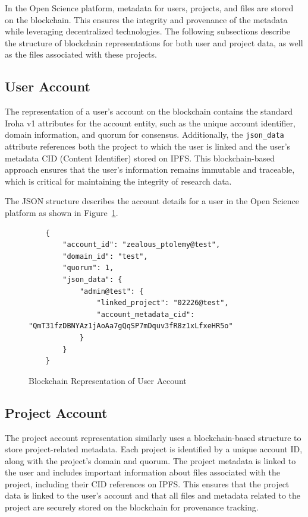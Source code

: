 \documentclass{article}
\begin{document}
In the Open Science platform, metadata for users, projects, and files are stored on the blockchain. This ensures the integrity and provenance of the metadata while leveraging decentralized technologies. The following subsections describe the structure of blockchain representations for both user and project data, as well as the files associated with these projects.

\subsection{User Account}

The representation of a user's account on the blockchain contains the standard Iroha v1 attributes for the account entity, such as the unique account identifier, domain information, and quorum for consensus. Additionally, the \texttt{json\_data} attribute references both the project to which the user is linked and the user's metadata CID (Content Identifier) stored on IPFS. This blockchain-based approach ensures that the user’s information remains immutable and traceable, which is critical for maintaining the integrity of research data.

The JSON structure describes the account details for a user in the Open Science platform as shown in Figure~\ref{fig:user_blockchain_representation}.

\begin{figure}[h]
      \centering
      \caption{Blockchain Representation of User Account}
      \label{fig:user_blockchain_representation}
      \begin{verbatim}
    {
        "account_id": "zealous_ptolemy@test",
        "domain_id": "test",
        "quorum": 1,
        "json_data": {
            "admin@test": {
                "linked_project": "02226@test",
                "account_metadata_cid": "QmT31fzDBNYAz1jAoAa7gQqSP7mDquv3fR8z1xLfxeHR5o"
            }
        }
    }
    \end{verbatim}
\end{figure}

\subsection{Project Account}

The project account representation similarly uses a blockchain-based structure to store project-related metadata. Each project is identified by a unique account ID, along with the project’s domain and quorum. The project metadata is linked to the user and includes important information about files associated with the project, including their CID references on IPFS. This ensures that the project data is linked to the user’s account and that all files and metadata related to the project are securely stored on the blockchain for provenance tracking.
\end{document}
